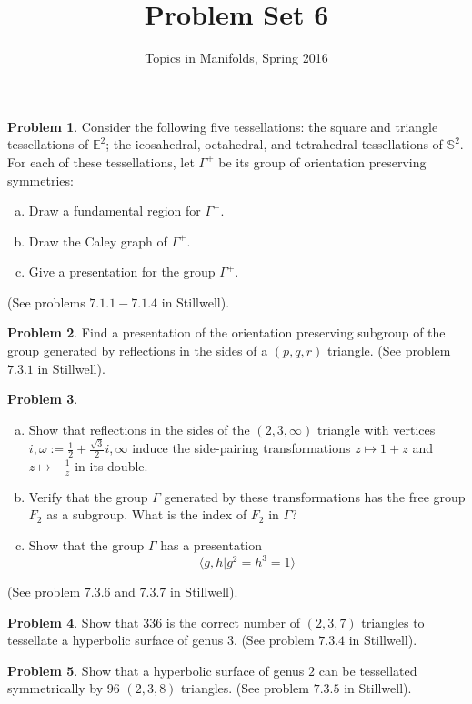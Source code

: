 \documentclass{amsart}
\newcommand{\+}[1]{\ensuremath{\mathbf{#1}}}
\theoremstyle{definition}
\newtheorem{prob}{Problem}
\begin{document}
\title{Problem Set 6}
\author{Topics in Manifolds, Spring 2016}

\maketitle



\begin{prob}
Consider the following five tessellations: the square and triangle tessellations of $\mathbb{E}^2$; the icosahedral, octahedral, and tetrahedral tessellations of $\mathbb{S}^2$.
For each of these tessellations, let $\Gamma^+$ be its group of orientation preserving symmetries:
\begin{enumerate}[(a)]
 \item Draw a fundamental region for $\Gamma^+$.
 \item Draw the Caley graph of $\Gamma^+$.
 \item Give a presentation for the group $\Gamma^+$.
\end{enumerate}
(See problems $7.1.1 - 7.1.4$ in Stillwell).
\end{prob}


\begin{prob}
Find a presentation of the orientation preserving subgroup of the group 
generated by reflections in the sides of a $(p,q,r)$ triangle.
(See problem $7.3.1$ in Stillwell).
\end{prob}


\begin{prob}
\begin{enumerate}[(a)]
 \item Show that reflections in the sides of the $(2,3,\infty)$ triangle
with vertices $i,\omega := \frac{1}{2} + \frac{\sqrt{3}}{2}i,\infty$
induce the side-pairing transformations $z \mapsto 1 + z$
and $z \mapsto -\frac{1}{z}$ in its double.  
\item Verify that the group $\Gamma$ generated by these transformations
has the free group $F_2$ as a subgroup.
What is the index of $F_2$ in $\Gamma$?
\item Show that the group $\Gamma$ has a presentation
\[
\langle g,h \vert g^2 = h^3 = 1 \rangle
\]
\end{enumerate}
(See problem $7.3.6$ and $7.3.7$ in Stillwell).
\end{prob}


\begin{prob}
 Show that $336$ is the correct number of $(2,3,7)$ triangles
 to tessellate a hyperbolic surface of genus $3$. 
 (See problem $7.3.4$ in Stillwell).
\end{prob}

\begin{prob}
 Show that a hyperbolic surface of genus $2$ can be tessellated symmetrically
 by $96$ $(2,3,8)$ triangles.
 (See problem $7.3.5$ in Stillwell).
\end{prob}
\end{document}
